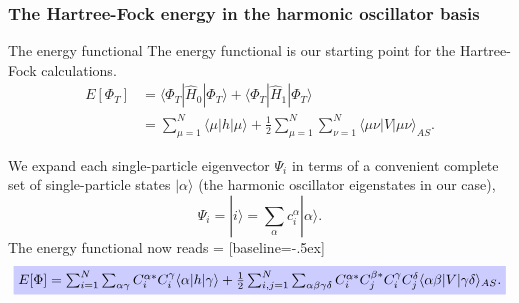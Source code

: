 \documentclass[xcolor=pdftex,hyperref={pdfpagelabels=false},table]{beamer}
\begin{document}
\begin{frame}
\frametitle{The Hartree-Fock energy in the harmonic oscillator basis}
\begin{scriptsize}
\begin{block}{The energy functional}
The energy functional is our starting point for the Hartree-Fock calculations.
\begin{align}
E [ \Phi_T ] &= \langle \Phi_T | \hat{H}_0 | \Phi_T  \rangle + \langle \Phi_T | \hat{H}_1 | \Phi_T  \rangle \\
 &= \sum_{\mu=1}^N \langle \mu |h| \mu \rangle + \frac{1}{2}  \sum_{\mu=1}^N \sum_{\nu=1}^N \langle \mu \nu |V| \mu \nu \rangle_{AS}.
\end{align}
\end{block}
We expand each single-particle eigenvector $\Psi_i$ in terms of a convenient complete set of single-particle states $|\alpha \rangle$ (the harmonic oscillator eigenstates in our case),
\begin{equation}
\Psi_i= |i \rangle = \sum_{\alpha} c_i^\alpha |\alpha \rangle.
\end{equation}
The energy functional now reads
 = [baseline=-.5ex]
\begin{equation}
         \tikz[baseline]{
            \node[fill=blue!20, anchor=base] (a1)
            {$E[\Phi] = \sum_{i=1}^N \sum_{\alpha \gamma} C_i^{\alpha *} C_i^{\gamma} \langle \alpha |h| \gamma \rangle + \frac{1}{2}   \sum_{i,j=1}^N \sum_{\alpha \beta \gamma \delta} C_i^{\alpha *} C_j^{\beta *} C_i^{\gamma} C_j^{\delta}  \langle \alpha \beta |V| \gamma \delta \rangle_{AS}.$};
        }
\end{equation}
\end{scriptsize}
\end{frame}
\end{document}
